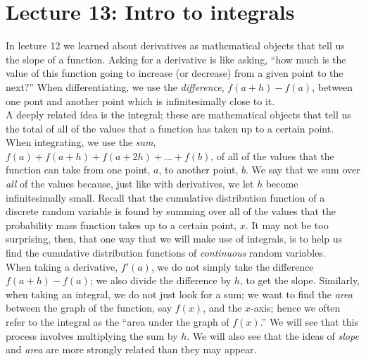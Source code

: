 \chapter{Lecture 13: Intro to integrals}
In lecture 12 we learned about derivatives as mathematical objects that tell us the slope of a function. Asking for a derivative is like asking, ``how much is the value of this function going to increase (or decrease) from a given point to the next?'' When differentiating, we use the \textit{difference}, $f(a+h) - f(a)$, between one pont and another point which is infinitesimally close to it. \\

\noindent A deeply related idea is the integral; these are mathematical objects that tell us the total of all of the values that a function has taken up to a certain point. When integrating, we use the \textit{sum}, $f(a) + f(a+h) + f(a + 2h) + \ldots + f(b)$, of all of the values that the function can take from one point, $a$, to another point, $b$. We say that we sum over \textit{all} of the values because, just like with derivatives, we let $h$ become infinitesimally small. Recall that the cumulative distribution function of a discrete random variable is found by summing over all of the values that the probability mass function takes up to a certain point, $x$. It may not be too surprising, then, that one way that we will make use of integrals, is to help us find the cumulative distribution functions of \textit{continuous} random variables. \\


\noindent When taking a derivative, $f'(a)$, we do not simply take the difference $f(a+h) - f(a)$; we also divide the difference by $h$, to get the slope. Similarly, when taking an integral, we do not just look for a sum; we want to find the \textit{area} between the graph of the function, say $f(x)$, and the $x$-axis; hence we often refer to the integral as the ``area under the graph of $f(x)$.'' We will see that this process involves multiplying the sum by $h$. We will also see that the ideas of \textit{slope} and \textit{area} are more strongly related than they may appear. \\


